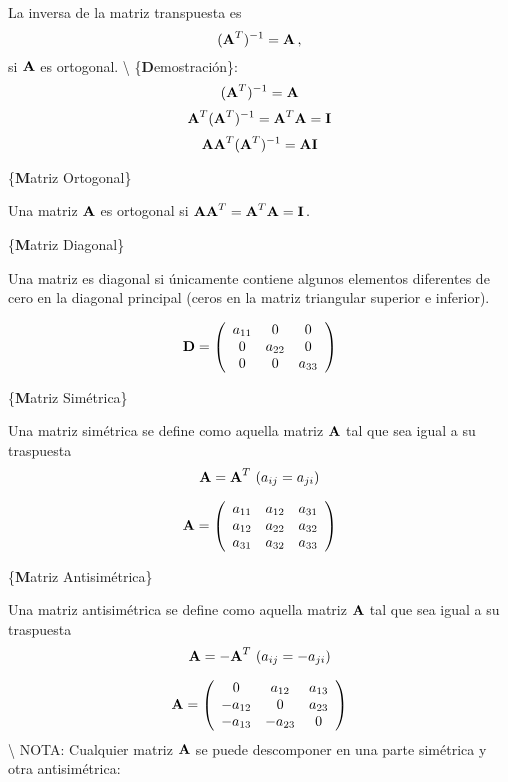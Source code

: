 \documentclass[
]{agujournal2019}
\begin{document}
La inversa de la matriz transpuesta es
\[({\textbf A}^T)^{-1}={\textbf A}\,,\] si \({\textbf A}\) es ortogonal.
\textbackslash{} \{\textbf Demostración\}:
\[({\textbf A}^T)^{-1}={\textbf A}\]
\[{\textbf A}^T({\textbf A}^T)^{-1}={\textbf A}^T{\textbf A}={\textbf I}\]
\[{\textbf A}{\textbf A}^T({\textbf A}^T)^{-1}={\textbf A}{\textbf I}\]

\vspace{0.5cm}

\{\noindent \textbf Matriz Ortogonal\}

Una matriz \({\textbf A}\) es ortogonal si
\({\textbf A}{\textbf A}^T={\textbf A}^T{\textbf A}={\textbf I}\,.\)

\vspace{0.5cm}

\{\noindent \textbf Matriz Diagonal\}

Una matriz es diagonal si únicamente contiene algunos elementos
diferentes de cero en la diagonal principal (ceros en la matriz
triangular superior e inferior).

\[{\textbf D}=\left(\begin{array}{ccc}
  a_{11} & 0 & 0\\
  0 & a_{22} & 0\\
  0 & 0 & a_{33}
\end{array}\right)
\]

\vspace{0.5cm}

\{\noindent \textbf Matriz Simétrica\}

Una matriz simétrica se define como aquella matriz \({\textbf A}\) tal
que sea igual a su traspuesta
\[{\textbf A}={\textbf A}^T\,\,(a_{ij}=a_{ji})\]

\[{\textbf A}=\left(\begin{array}{cccc}
  a_{11} & a_{12} & a_{31}\\
  a_{12} & a_{22} & a_{32}\\
  a_{31} & a_{32} & a_{33}\\
\end{array}\right)
\]

\vspace{0.5cm}

\{\noindent \textbf Matriz Antisimétrica\}

Una matriz antisimétrica se define como aquella matriz \({\textbf A}\)
tal que sea igual a su traspuesta
\[{\textbf A}=-{\textbf A}^T\,\,(a_{ij}=-a_{ji})\]

\[{\textbf A}=\left(\begin{array}{cccc}
  0 & a_{12} & a_{13}\\
  -a_{12} & 0 & a_{23}\\
  -a_{13} & -a_{23} & 0\\
\end{array}\right)
\] \textbackslash{} NOTA: Cualquier matriz \({\textbf A}\) se puede
descomponer en una parte simétrica y otra antisimétrica:
\end{document}
